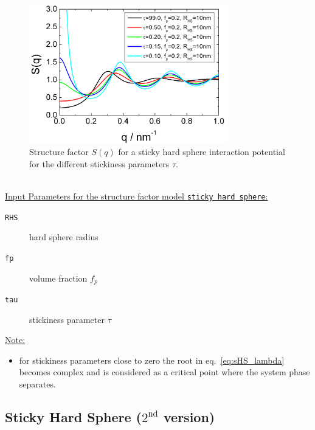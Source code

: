 \begin{figure}[htb]
\begin{center}
\includegraphics[width=0.768\textwidth]{../images/structure_factor/HardSphere/StickyHardSphere1.png}
\end{center}
\caption{Structure factor $S(q)$ for a sticky hard sphere interaction potential for the different
stickiness parameters $\tau$.}
\label{fig:SQStickyHardSphere1}
\end{figure}

~\\
\uline{Input Parameters for the structure factor model \texttt{sticky hard sphere}:}
\begin{description}
\item[\texttt{RHS}] hard sphere radius
\item[\texttt{fp}] volume fraction $f_p$
\item[\texttt{tau}] stickiness parameter $\tau$
\end{description}

\noindent\uline{Note:}
\begin{itemize}
\item for stickiness parameters close to zero the root in eq.\ \ref{eq:sHS_lambda} becomes complex and is considered as a critical point where the system phase separates.
\end{itemize}



\subsection{Sticky Hard Sphere ($2^\text{nd}$ version)}~\\

